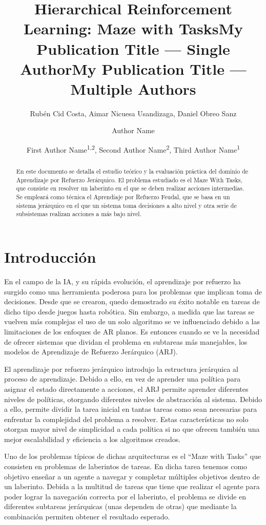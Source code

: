 \documentclass[letterpaper]{article} %
\title{Hierarchical Reinforcement Learning: Maze with Tasks}
\author{
    Rubén Cid Costa, Aimar Nicuesa Usandizaga, Daniel Obreo Sanz
}
\title{My Publication Title --- Single Author}
\author {
    Author Name
}
\title{My Publication Title --- Multiple Authors}
\author {
    First Author Name\textsuperscript{\rm 1,\rm 2},
    Second Author Name\textsuperscript{\rm 2},
    Third Author Name\textsuperscript{\rm 1}
}
\begin{document}
\maketitle

\begin{abstract}
En este documento se detalla el estudio teórico y la evaluación práctica del dominio de Aprendizaje por Refuerzo Jerárquico. El problema estudiado es el Maze With Tasks, que consiste en resolver un laberinto en el que se deben realizar acciones intermedias. Se empleará como técnica el Aprendiaje por Refuerzo Feudal, que se basa en un sistema jerárquico en el que un sistema toma decisiones a alto nivel y otra serie de subsistemas realizan acciones a más bajo nivel.
\end{abstract}


\section{Introducción}
En el campo de la IA, y su rápida evolución, el aprendizaje por refuerzo ha surgido como una herramienta poderosa para los problemas que implican toma de decisiones. Desde que se crearon, quedo demostrado su éxito notable en tareas de dicho tipo desde juegos hasta robótica. Sin embargo, a medida que las tareas se vuelven más complejas el uso de un solo algoritmo se ve influenciado debido a las limitaciones de los enfoques de AR planos. Es entonces cuando se ve la necesidad de ofrecer sistemas que dividan el problema en subtareas más manejables, los modelos de Aprendizaje de Refuerzo Jerárquico (ARJ).

El aprendizaje por refuerzo jerárquico introdujo la estructura jerárquica al proceso de aprendizaje. Debido a ello, en vez de aprender una política para asignar el estado directamente a acciones, el ARJ permite aprender diferentes niveles de políticas, otorgando diferentes niveles de abstracción al sistema. Debido a ello, permite dividir la tarea inicial en tantas tareas como sean necesarias para enfrentar la complejidad del problema a resolver. Estas características no solo otorgan mayor nivel de simplicidad a cada política si no que ofrecen también una mejor escalabilidad y eficiencia a los algoritmos creados.

Uno de los problemas típicos de dichas arquitecturas es el “Maze with Tasks” que consisten en problemas de laberintos de tareas. En dicha tarea tenemos como objetivo enseñar a un agente a navegar y completar múltiples objetivos dentro de un laberinto. Debida a la multitud de tareas que tiene que realizar el agente para poder lograr la navegación correcta por el laberinto, el problema se divide en diferentes subtareas jerárquicas (unas dependen de otras) que mediante la combinación permiten obtener el resultado esperado.
\end{document}
